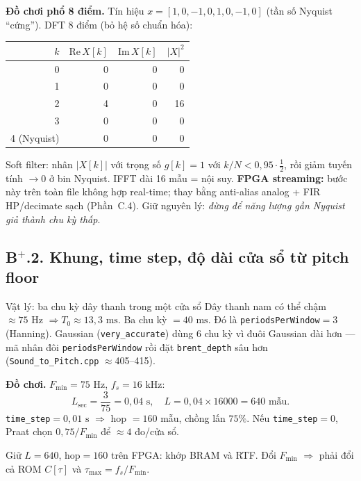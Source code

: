 \noindent\textbf{Đồ chơi phổ 8 điểm.} Tín hiệu $x=[1,0,-1,0,1,0,-1,0]$ (tần số Nyquist ``cứng''). DFT 8 điểm (bỏ hệ số chuẩn hóa):
\begin{center}\small
\begin{tabular}{@{}rrrr@{}}
\toprule
$k$ & $\mathrm{Re}\,X[k]$ & $\mathrm{Im}\,X[k]$ & $|X|^2$ \\
\midrule
0 & 0 & 0 & 0 \\
1 & 0 & 0 & 0 \\
2 & 4 & 0 & 16 \\
3 & 0 & 0 & 0 \\
4 (Nyquist) & 0 & 0 & 0 \\
\bottomrule
\end{tabular}
\end{center}
Soft filter: nhân $|X[k]|$ với trọng số $g[k]=1$ với $k/N < 0{,}95\cdot\tfrac12$, rồi giảm tuyến tính $\to0$ ở bin Nyquist. IFFT dài 16 mẫu = nội suy. \textbf{FPGA streaming:} bước này trên toàn file không hợp real-time; thay bằng anti-alias analog + FIR HP/decimate sạch (Phần~C.4). Giữ nguyên lý: \emph{đừng để năng lượng gần Nyquist giả thành chu kỳ thấp}.

\subsection*{B$^+$.2. Khung, time step, độ dài cửa sổ từ pitch floor}

\begin{firstprin}{Vật lý: ba chu kỳ dây thanh trong một cửa sổ}
Dây thanh nam có thể chậm $\approx 75\text{ Hz}$ $\Rightarrow T_0\approx 13{,}3\text{ ms}$. Ba chu kỳ $=40\text{ ms}$. Đó là \texttt{periodsPerWindow}$=3$ (Hanning). Gaussian (\texttt{very\_accurate}) dùng 6 chu kỳ vì đuôi Gaussian dài hơn --- mã nhân đôi \texttt{periodsPerWindow} rồi đặt \texttt{brent\_depth} sâu hơn (\texttt{Sound\_to\_Pitch.cpp} $\approx$405--415).
\end{firstprin}

\noindent\textbf{Đồ chơi.} $F_{\min}=75\text{ Hz}$, $f_s=16\text{ kHz}$:
\[
L_{\text{sec}} = \frac{3}{75}=0{,}04\text{ s},\quad
L = 0{,}04\times 16000 = 640\text{ mẫu}.
\]
\texttt{time\_step}$=0{,}01\text{ s}$ $\Rightarrow$ hop $=160$ mẫu, chồng lấn $75\%$. Nếu \texttt{time\_step}$=0$, Praat chọn $0{,}75/F_{\min}$ để $\approx4$ đo/cửa sổ.

\begin{costbox}
Giữ $L=640$, hop$=160$ trên FPGA: khớp BRAM và RTF. Đổi $F_{\min}$ $\Rightarrow$ phải đổi cả ROM $C[\tau]$ và $\tau_{\max}=f_s/F_{\min}$.
\end{costbox}

